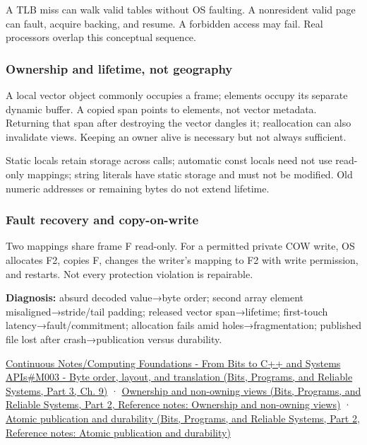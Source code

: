 A TLB miss can walk valid tables without OS faulting. A nonresident valid page can fault, acquire backing, and resume. A forbidden access may fail. Real processors overlap this conceptual sequence.

\subsubsection{Ownership and lifetime, not geography}\label{appendix-92ff77d4dfdc-ownership-and-lifetime-not-geography}

\hypertarget{appendix-92ff77d4dfdc-ownership-and-lifetime-not-geography}{}

A local vector object commonly occupies a frame; elements occupy its separate dynamic buffer. A copied span points to elements, not vector metadata. Returning that span after destroying the vector dangles it; reallocation can also invalidate views. Keeping an owner alive is necessary but not always sufficient.

Static locals retain storage across calls; automatic const locals need not use read-only mappings; string literals have static storage and must not be modified. Old numeric addresses or remaining bytes do not extend lifetime.

\subsubsection{Fault recovery and copy-on-write}\label{appendix-92ff77d4dfdc-fault-recovery-and-copy-on-write}

\hypertarget{appendix-92ff77d4dfdc-fault-recovery-and-copy-on-write}{}

Two mappings share frame F read-only. For a permitted private COW write, OS allocates F2, copies F, changes the writer's mapping to F2 with write permission, and restarts. Not every protection violation is repairable.

\textbf{Diagnosis:} absurd decoded value→byte order; second array element misaligned→stride/tail padding; released vector span→lifetime; first-touch latency→fault/commitment; allocation fails amid holes→fragmentation; published file lost after crash→publication versus durability.

\href{../01-Bits-Programs-and-Reliable-Systems-P03/main.pdf\#nameddest=01-foundations-i-ch011-m003---byte-order-layout-and-translation}{Continuous Notes/Computing Foundations - From Bits to C++ and Systems APIs\#M003 - Byte order, layout, and translation (Bits, Programs, and Reliable Systems, Part 3, Ch. 9)} · \href{../01-Bits-Programs-and-Reliable-Systems-P02/main.pdf\#nameddest=appendix-d52e4486f527}{Ownership and non-owning views (Bits, Programs, and Reliable Systems, Part 2, Reference notes: Ownership and non-owning views)} · \href{../01-Bits-Programs-and-Reliable-Systems-P02/main.pdf\#nameddest=appendix-e89a8f290ef5}{Atomic publication and durability (Bits, Programs, and Reliable Systems, Part 2, Reference notes: Atomic publication and durability)}

